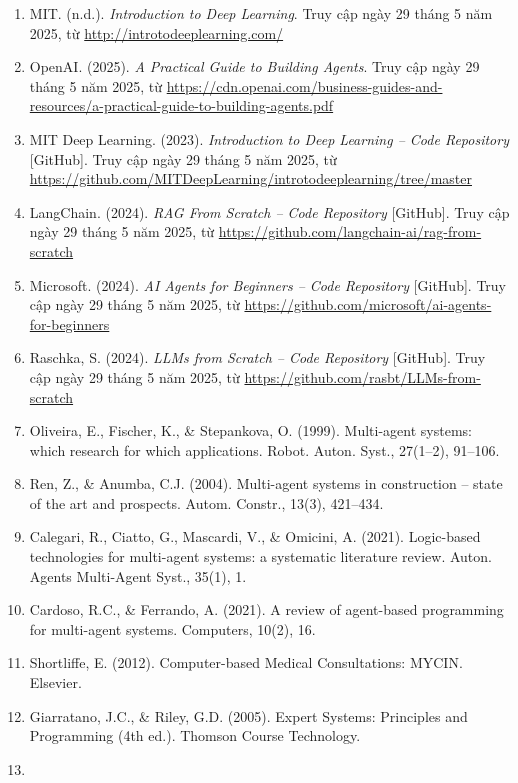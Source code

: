 \begin{enumerate}
\def\labelenumi{\arabic{enumi}.}
\item
  MIT. (n.d.). \emph{Introduction to Deep Learning}. Truy cập ngày 29
  tháng 5 năm 2025, từ
  \url{http://introtodeeplearning.com/}
\item
  OpenAI. (2025). \emph{A Practical Guide to Building Agents}. Truy cập
  ngày 29 tháng 5 năm 2025, từ
  \url{https://cdn.openai.com/business-guides-and-resources/a-practical-guide-to-building-agents.pdf}
\item
  MIT Deep Learning. (2023). \emph{Introduction to Deep Learning -- Code
  Repository} {[}GitHub{]}. Truy cập ngày 29 tháng 5 năm 2025, từ
  \url{https://github.com/MITDeepLearning/introtodeeplearning/tree/master}
\item
  LangChain. (2024). \emph{RAG From Scratch -- Code Repository}
  {[}GitHub{]}. Truy cập ngày 29 tháng 5 năm 2025, từ
  \url{https://github.com/langchain-ai/rag-from-scratch}
\item
  Microsoft. (2024). \emph{AI Agents for Beginners -- Code Repository}
  {[}GitHub{]}. Truy cập ngày 29 tháng 5 năm 2025, từ
  \url{https://github.com/microsoft/ai-agents-for-beginners}
\item
  Raschka, S. (2024). \emph{LLMs from Scratch -- Code Repository}
  {[}GitHub{]}. Truy cập ngày 29 tháng 5 năm 2025, từ
  \url{https://github.com/rasbt/LLMs-from-scratch}
\item
  Oliveira, E., Fischer, K., \& Stepankova, O. (1999). Multi-agent
  systems: which research for which applications. Robot. Auton. Syst.,
  27(1--2), 91--106.
\item
  Ren, Z., \& Anumba, C.J. (2004). Multi-agent systems in construction
  -- state of the art and prospects. Autom. Constr., 13(3), 421--434.
\item
  Calegari, R., Ciatto, G., Mascardi, V., \& Omicini, A. (2021).
  Logic-based technologies for multi-agent systems: a systematic
  literature review. Auton. Agents Multi-Agent Syst., 35(1), 1.
\item
  Cardoso, R.C., \& Ferrando, A. (2021). A review of agent-based
  programming for multi-agent systems. Computers, 10(2), 16.
\item
  Shortliffe, E. (2012). Computer-based Medical Consultations: MYCIN.
  Elsevier.
\item
  Giarratano, J.C., \& Riley, G.D. (2005). Expert Systems: Principles
  and Programming (4th ed.). Thomson Course Technology.
\item

\end{enumerate}
